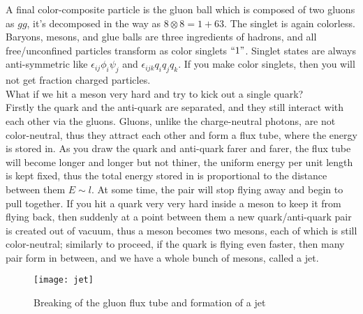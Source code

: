 \documentclass{article}
\renewcommand{\1}{\left}
\renewcommand{\2}{\right}
\newcommand{\ep}{\epsilon}
\begin{document}
A final color-composite particle is the gluon ball which is composed of two gluons as $gg$, it's decomposed in the way as $8\otimes 8=1+63$. The singlet is again colorless.\\

Baryons, mesons, and glue balls are three ingredients of hadrons, and all free/unconfined particles transform as color singlets $``1"$. Singlet states are always anti-symmetric like $\ep_{ij}\phi_i\psi_j$ and $\ep_{ijk}q_iq_jq_k$. If you make color singlets, then you will not get fraction charged particles.\\

What if we hit a meson very hard and try to kick out a single quark?\\
Firstly the quark and the anti-quark are separated, and they still interact with each other via the gluons. Gluons, unlike the charge-neutral photons, are not color-neutral, thus they attract each other and form a flux tube, where the energy is stored in. As you draw the quark and anti-quark farer and farer, the flux tube will become longer and longer but not thiner, the uniform energy per unit length is kept fixed, thus the total energy stored in is proportional to the distance between them $E\sim l$. At some time, the pair will stop flying away and begin to pull together. If you hit a quark very very hard inside a meson to keep it from flying back, then suddenly at a point between them a new quark/anti-quark pair is created out of vacuum, thus a meson becomes two mesons, each of which is still color-neutral; similarly to proceed, if the quark is flying even faster, then many pair form in between, and we have a whole bunch of mesons, called a jet.
\begin{figure}[h]
\centering
\texttt{[image: jet]}
\caption{Breaking of the gluon flux tube and formation of a jet}
\end{figure}\\
\end{document}
